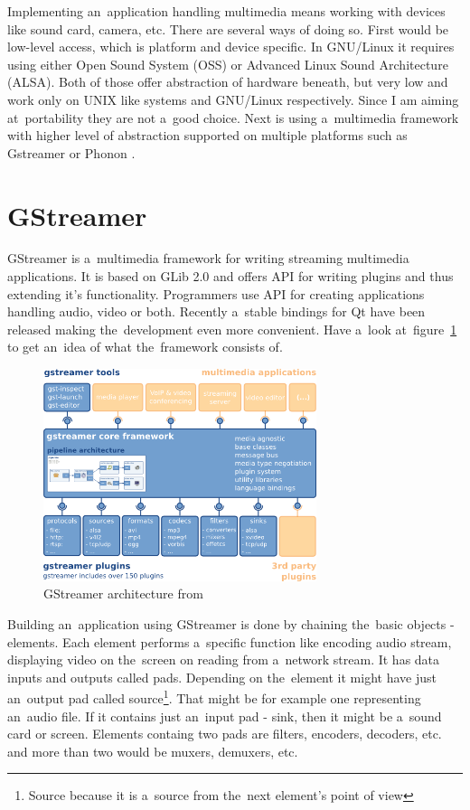 Implementing an~application handling multimedia means working with devices like sound card, camera, etc. There are several ways of doing so. First would be low-level access, which is platform and device specific. In GNU/Linux it requires using either Open Sound System (OSS) or Advanced Linux Sound Architecture (ALSA). Both of those offer abstraction of hardware beneath, but very low and work only on UNIX like systems and GNU/Linux respectively. Since I am aiming at~portability they are not a~good choice. Next is using a~multimedia framework with higher level of abstraction supported on multiple platforms such as Gstreamer \cite{gstreamer} or Phonon \cite{phonon}.  

\section{GStreamer}
GStreamer is a~multimedia framework for writing streaming multimedia applications. It is based on GLib 2.0 and offers API for writing plugins and thus extending it's functionality. Programmers use API for creating applications handling audio, video or both. Recently a~stable bindings for Qt have been released making the~development even more convenient. Have a~look at~figure~\ref{fig:gstreamerArchitecture} to get an~idea of what the~framework consists of.  

\begin{figure}[ht]
	\begin{center}
	\includegraphics[width=8cm]{fig/gstreamer-architecture.png}
	\caption{GStreamer architecture from \cite{gstreamer}}
	\label{fig:gstreamerArchitecture}
\end{center}
\end{figure}

Building an~application using GStreamer is done by chaining the~basic objects - elements. Each element performs a~specific function like encoding audio stream, displaying video on the~screen on reading from a~network stream. It has data inputs and outputs called pads. Depending on the~element it might have just an~output pad called source\footnote{Source because it is a~source from the~next element's point of view}. That might be for example one representing an~audio file. If it contains just an~input pad - sink, then it might be a~sound card or screen. Elements containg two pads are filters, encoders, decoders, etc. and more than two would be muxers, demuxers, etc.

